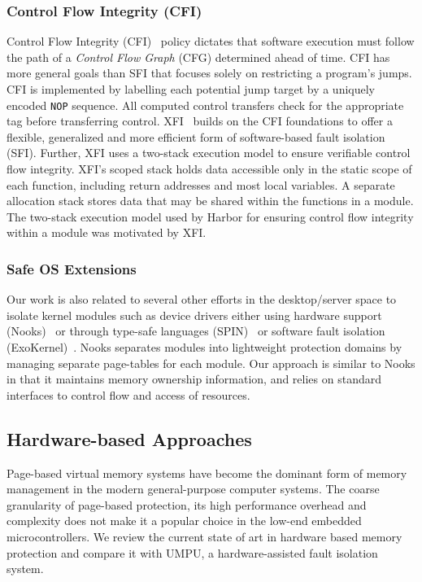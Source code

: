 \subsubsection{Control Flow Integrity (CFI)}
%
Control Flow Integrity (CFI)~\cite{cfi05msr} policy dictates that
software execution must follow the path of a \emph{Control Flow Graph}
(CFG) determined ahead of time.
%
CFI has more general goals than SFI that focuses solely on restricting a
program's jumps.
%
CFI is implemented by labelling each potential jump target by a
uniquely encoded \texttt{NOP} sequence.
%
All computed control transfers check for the appropriate tag before
transferring control.
%
XFI~\cite{xfi06osdi} builds on the CFI foundations to offer a
flexible, generalized and more efficient form of software-based fault
isolation (SFI).
%
Further, XFI uses a two-stack execution model to ensure verifiable
control flow integrity.
%
XFI's scoped stack holds data accessible only in the static scope of
each function, including return addresses and most local variables.
%
A separate allocation stack stores data that may be shared within the
functions in a module.
%
The two-stack execution model used by Harbor for ensuring control flow
integrity within a module was motivated by XFI.
%
\subsubsection{Safe OS Extensions}
%
Our work is also related to several other efforts in the
desktop/server space to isolate kernel modules such as device drivers
either using hardware support (Nooks)~\cite{swift05nooks} or through type-safe
languages (SPIN)~\cite{spin95sosp} or software fault isolation
(ExoKernel)~\cite{exo97sosp}.
%
Nooks separates modules into lightweight protection domains by
managing separate page-tables for each module.
%
Our approach is similar to Nooks in that it maintains memory ownership
information, and relies on standard interfaces to control flow and
access of resources.
%
\subsection{Hardware-based Approaches}
%
Page-based virtual memory systems have become the dominant form of
memory management in the modern general-purpose computer systems.
%
The coarse granularity of page-based protection, its high performance
overhead and complexity does not make it a popular choice in the
low-end embedded microcontrollers.
%
We review the current state of art in hardware based memory protection
and compare it with UMPU, a hardware-assisted fault isolation system.
%
